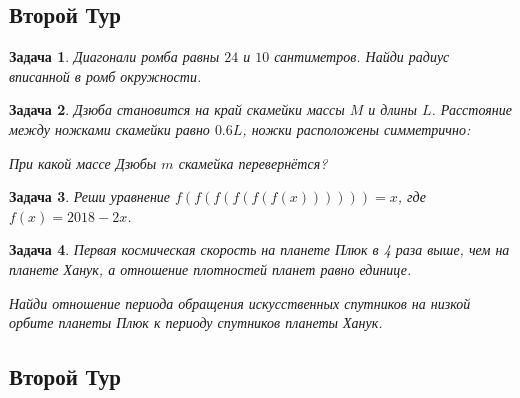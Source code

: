 \documentclass[a4paper, 12pt]{article}
\theoremstyle{break}
\newtheorem{problem}{Задача}[subsection]
\begin{document}
\thispagestyle{empty}
\subsection*{Второй Тур}

\begin{problem}
Диагонали ромба равны $24$ и $10$ сантиметров. Найди радиус вписанной в ромб окружности.
\end{problem}

\begin{problem}
Дзюба становится на край скамейки массы $M$ и длины $L$.
Расстояние между ножками скамейки равно $0.6L$,
ножки расположены симметрично:

\begin{minipage}{0.8\textwidth}
\begin{center}
\end{center}
\end{minipage}



При какой массе Дзюбы $m$ скамейка перевернётся?
\end{problem}



\begin{problem}
Реши уравнение $f(f(f(f(f(f(x)))))) = x$, где $f(x) = 2018 - 2x$.
\end{problem}



\begin{problem}
Первая космическая скорость на планете Плюк
в 4 раза выше, чем на планете Ханук, а отношение плотностей планет равно единице.

Найди отношение периода обращения искусственных спутников
на низкой орбите планеты Плюк к периоду спутников планеты Ханук.
\end{problem}




\subsection*{Второй Тур}
\setcounter{problem}{0}
\end{document}
